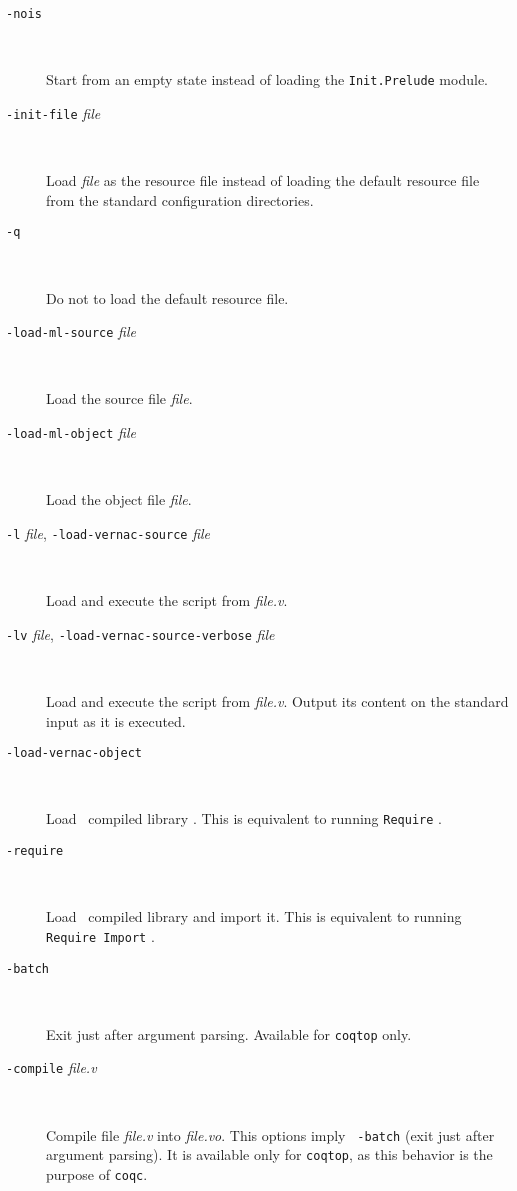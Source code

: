 \begin{description}
\item[{\tt -nois}]\ %

  Start from an empty state instead of loading the {\tt Init.Prelude}
  module.

\item[{\tt -init-file} {\em file}]\ %

  Load {\em file} as the resource file instead of loading the default
  resource file from the standard configuration directories.

\item[{\tt -q}]\ %

  Do not to load the default resource file.

\item[{\tt -load-ml-source} {\em file}]\ %

  Load the {\ocaml} source file {\em file}.

\item[{\tt -load-ml-object} {\em file}]\ %

  Load the {\ocaml} object file {\em file}.

\item[{\tt -l} {\em file}, {\tt -load-vernac-source} {\em file}]\ %

  Load and execute the {\Coq} script from {\em file.v}.

\item[{\tt -lv} {\em file}, {\tt -load-vernac-source-verbose} {\em
    file}]\ %

  Load and execute the {\Coq} script from {\em file.v}.
  Output its content on the standard input as it is executed.

\item[{\tt -load-vernac-object} {\dirpath}]\ %

  Load \Coq~compiled library {\dirpath}. This is equivalent to running
  {\tt Require} {\dirpath}.

\item[{\tt -require} {\dirpath}]\ %

  Load \Coq~compiled library {\dirpath} and import it. This is equivalent
  to running {\tt Require Import} {\dirpath}.

\item[{\tt -batch}]\ %

  Exit just after argument parsing. Available for {\tt coqtop} only.

\item[{\tt -compile} {\em file.v}]\ %

  Compile file {\em file.v} into {\em file.vo}. This options imply {\tt
    -batch} (exit just after argument parsing). It is available only
  for {\tt coqtop}, as this behavior is the purpose of {\tt coqc}.


\end{description}

